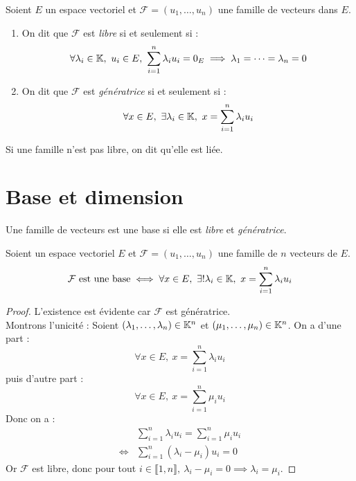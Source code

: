 \begin{definition}
	Soient $E$ un espace vectoriel et $\mathcal{F} = (u_1, \ldots, u_n)$ une famille de vecteurs dans $E$.
	\begin{enumerate}
		\item On dit que $\mathcal{F}$ est \emph{libre} si et seulement si :
		\begin{align*}
			\forall \lambda_i \in \mathbb{K},\ u_i \in E,\ \sum_{i = 1}^n \lambda_i u_i = 0_E \implies \lambda_1 = \cdots = \lambda_n = 0
		\end{align*}
		\item On dit que $\mathcal{F}$ est \emph{génératrice} si et seulement si :
		\begin{align*}
			\forall x \in E,\ \exists \lambda_i \in \mathbb{K},\ x = \sum_{i = 1}^n \lambda_i u_i 
		\end{align*}
	\end{enumerate}
\end{definition}

\begin{remark}
	Si une famille n'est pas libre, on dit qu'elle est liée.
\end{remark}

\section{Base et dimension}
\begin{definition}[Base]
	Une famille de vecteurs est une base si elle est \emph{libre} et \emph{génératrice}.
\end{definition}

\begin{proposition}
	Soient un espace vectoriel $E$ et $\mathcal{F} = (u_1, \ldots, u_n)$ une famille de $n$ vecteurs de $E$.
	\[ 
	\mathcal{F} \text{ est une base} \iff 
	\forall x \in E,\ \exists ! \lambda_i \in \mathbb{K},\ x = \sum_{i = 1}^n \lambda_i u_i
	\]
\end{proposition}

\begin{proof}
	L'existence est évidente car $\mathcal{F}$ est génératrice. 
	\\
	Montrons l'unicité : Soient $(\lambda_1, \ldots, \lambda_n) \in \mathbb{K}^n$ et $(\mu_1, \ldots, \mu_n) \in \mathbb{K}^n$.
	On a d'une part :
	\[ \forall x \in E,\ x = \sum_{i=1}^{n} \lambda_i u_i \]
	puis d'autre part :
	\[ \forall x \in E,\ x = \sum_{i=1}^{n} \mu_i u_i \]
	Donc on a :
	\begin{align*}
		&\sum_{i=1}^{n} \lambda_i u_i = \sum_{i=1}^{n} \mu_i u_i \\
		\iff &\sum_{i=1}^{n} (\lambda_i - \mu_i) u_i = 0 
	\end{align*}
	Or $\mathcal{F}$ est libre, donc pour tout $i \in \llbracket 1, n \rrbracket,\ \lambda_i - \mu_i = 0 \implies \lambda_i = \mu_i$.
\end{proof}

